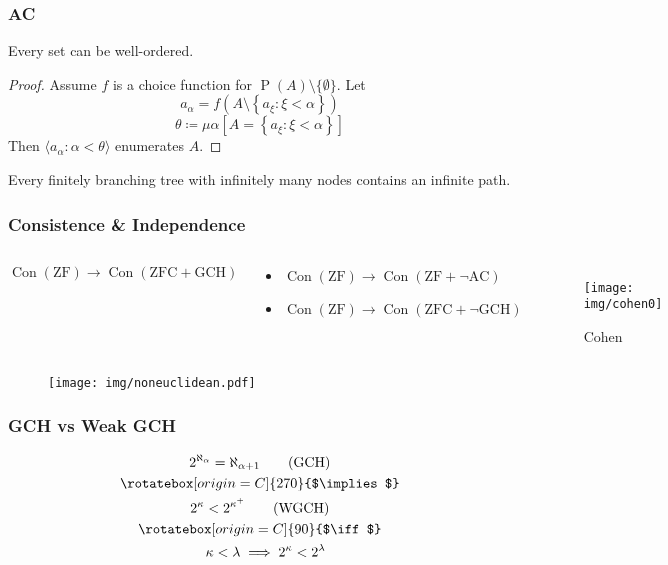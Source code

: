 \documentclass[UTF8,11pt,colorlinks,compress,openany]{beamer}%
\begin{document}
\begin{frame}\frametitle{AC}
	\begin{theorem}
		Every set can be well-ordered.
	\end{theorem}
	\begin{proof}
		Assume $f$ is a choice function for $\operatorname{P}(A)\setminus\{\emptyset\}$. Let
		\[a_\alpha=f\left(A\setminus\left\{a_\xi: \xi<\alpha\right\}\right)\]
		\[\theta\coloneqq \mu\alpha\left[A=\left\{a_\xi: \xi<\alpha\right\}\right]\]
		Then $\langle a_\alpha: \alpha<\theta\rangle$ enumerates $A$.
	\end{proof}
	\begin{lemma}
		Every finitely branching tree with infinitely many nodes contains an infinite path.
	\end{lemma}
\end{frame}

\begin{frame}\frametitle{Consistence \& Independence}
	\begin{columns}
			\begin{theorem}[G\"odel1938]
				\[\operatorname{Con}(\mathrm{ZF})\to\operatorname{Con}(\mathrm{ZFC+GCH})\]
			\end{theorem}
			\begin{theorem}[Cohen1963]
				\begin{itemize}
					\item $\operatorname{Con}(\mathrm{ZF})\to\operatorname{Con}(\mathrm{ZF}+\neg\mathrm{AC})$
					\item $\operatorname{Con}(\mathrm{ZF})\to\operatorname{Con}(\mathrm{ZFC}+\neg\mathrm{GCH})$
				\end{itemize}
			\end{theorem}
			\begin{figure}
				\texttt{[image: img/cohen0]}\caption{Cohen}
			\end{figure}
	\end{columns}
			\begin{figure}
				\texttt{[image: img/noneuclidean.pdf]}
			\end{figure}
\end{frame}

\begin{frame}\frametitle{GCH vs Weak GCH}
\begin{gather*}
2^{\aleph_\alpha}=\aleph_{\alpha+1}\tag{GCH}\\
\rotatebox[origin=C]{270}{$\implies$}\\
2^\kappa<2^{\kappa^+}\tag{WGCH}\\
\rotatebox[origin=C]{90}{$\iff$}\\
\;\;\;\kappa<\lambda\implies 2^\kappa<2^\lambda
\end{gather*}
\centering{}
\end{frame}
\end{document}
